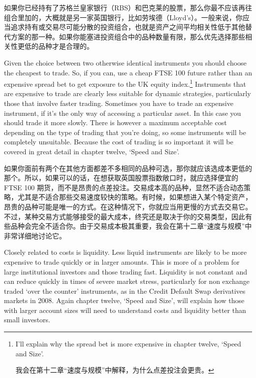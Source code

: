 \begin{chineseblock}如果你已经持有了苏格兰皇家银行（RBS）和巴克莱的股票，那么你最不应该再往组合里加的，大概就是另一家英国银行，比如劳埃德（Lloyd's）。一般来说，你应当追求持有或交易尽可能分散的投资组合，也就是资产之间平均相关性低于其他替代方案的那一种。如果你能塞进投资组合中的品种数量有限，那么优先选择那些相关性更低的品种才是合理的。\end{chineseblock}


\begin{englishblock} Given the choice between two otherwise identical instruments you should choose the cheapest to trade. So, if you can, use a cheap FTSE 100 future rather than an expensive spread bet to get exposure to the UK equity index.\footnote{I'll explain why the spread bet is more expensive in chapter twelve, ‘Speed and Size'. \par 我会在第十二章“速度与规模”中解释，为什么点差投注会更贵。} Instruments that are expensive to trade are clearly less suitable for dynamic strategies, particularly those that involve faster trading. Sometimes you have to trade an expensive instrument, if it's the only way of accessing a particular asset. In this case you should trade it more slowly. There is however a maximum acceptable cost depending on the type of trading that you're doing, so some instruments will be completely unsuitable. Because the cost of trading is so important it will be covered in great detail in chapter twelve, ‘Speed and Size'. \end{englishblock}

\begin{chineseblock}如果你面前有两个在其他方面都差不多相同的品种可选，那你就应该选成本更低的那个。所以，如果可以的话，在想获取英国股票指数敞口时，就应选择便宜的 FTSE 100 期货，而不是昂贵的点差投注。交易成本高的品种，显然不适合动态策略，尤其是不适合那些交易速度较快的策略。有时候，如果想进入某个特定资产，昂贵的品种可能是唯一的方式。在这种情况下，你就应当用更慢的方式去交易它。不过，某种交易方式能够接受的最大成本，终究还是取决于你的交易类型，因此有些品种会完全不适合你。由于交易成本极其重要，我会在第十二章“速度与规模”中非常详细地讨论它。\end{chineseblock}


\begin{englishblock} Closely related to costs is liquidity. Less liquid instruments are likely to be more expensive to trade quickly or in larger amounts. This is more of a problem for large institutional investors and those trading fast. Liquidity is not constant and can reduce quickly in times of severe market stress, particularly for non exchange traded ‘over the counter' instruments, as in the Credit Default Swap derivatives markets in 2008. Again chapter twelve, ‘Speed and Size', will explain how those with larger account sizes will need to understand costs and liquidity better than small investors. \end{englishblock}

